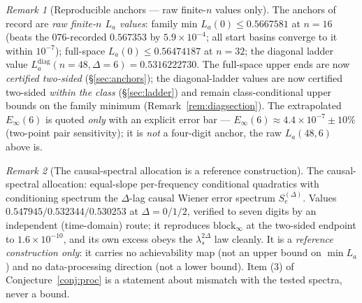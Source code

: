 \documentclass[11pt]{article}
\theoremstyle{definition}
\theoremstyle{remark}
\newtheorem{remark}{Remark}
\begin{document}
\begin{remark}[Reproducible anchors --- raw finite-$n$ values only]
\label{rem:anchors}
The anchors of record are \emph{raw finite-$n$ $L_a$ values}: family
min $L_a(0)\le0.5667581$ at $n=16$ (beats the 076-recorded
$0.567353$ by $5.9\times10^{-4}$; all start basins converge to it
within $10^{-7}$); full-space $L_a(0)\le0.56474187$ at $n=32$; the
diagonal ladder value $L_a^{\mathrm{diag}}(n{=}48,\Delta{=}6)
=0.5316222730$. The full-space upper ends are now \emph{certified
two-sided} (\S\ref{sec:anchors}); the diagonal-ladder values are now
certified two-sided \emph{within the class} (\S\ref{sec:ladder}) and
remain class-conditional upper bounds on the family minimum
(Remark~\ref{rem:diagsection}). The extrapolated $E_\infty(6)$ is quoted \emph{only}
with an explicit error bar --- $E_\infty(6)\approx4.4\times10^{-7}
\pm10\%$ (two-point pair sensitivity); it is \emph{not} a four-digit
anchor, the raw $L_a(48,6)$ above is.
\end{remark}

\begin{remark}[The causal-spectral allocation is a reference
construction]
\label{rem:refcon}
The causal-spectral allocation: equal-slope per-frequency
conditional quadratics with conditioning spectrum the $\Delta$-lag
causal Wiener error spectrum $S_e^{(\Delta)}$. Values
$0.547945/0.532344/0.530253$ at $\Delta=0/1/2$, verified to seven
digits by an independent (time-domain) route; it reproduces
$\mathrm{block}_\infty$ at the two-sided endpoint to
$1.6\times10^{-10}$, and its own excess obeys the
$\lambda_s^{2\Delta}$ law cleanly. It is a \emph{reference
construction only}: it carries no achievability map (not an upper
bound on $\min L_a$) and no data-processing direction (not a lower
bound). Item (3) of Conjecture~\ref{conj:proc} is a statement about
mismatch with the tested spectra, never a bound.
\end{remark}
\end{document}
